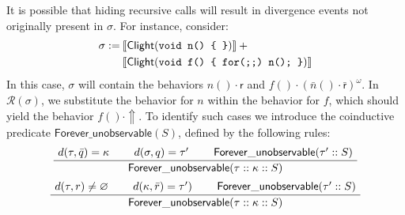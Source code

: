\documentclass[11pt]{article}
\newcommand{\kw}[1]{{\mathsf{#1}}}
\begin{document}
It is possible that hiding recursive calls
will result in divergence events not originally present in $\sigma$.
For instance, consider:
\begin{align*}
  \sigma := \: &\llbracket \kw{Clight}(\mbox{\tt void n() \{ \}}) \rrbracket \: + \\
 &\llbracket \kw{Clight}(\mbox{\tt void f() \{ for(;;) n(); \}}) \rrbracket
\end{align*}
In this case, $\sigma$ will contain the behaviors
$n() \cdot \kw{r}$ and $f() \cdot (\bar{n}() \cdot \bar{\kw{r}})^\omega$.
In $\mathcal{R}(\sigma)$,
we substitute the behavior for $n$ within the behavior for $f$,
which should yield the behavior $f() \cdot \Uparrow$.
To identify such cases we introduce the coinductive predicate
$\kw{Forever\_unobservable}(S)$,
defined by the following rules:
\[
  \AxiomC{$d(\tau, \bar{q}) = \kappa$}
  \AxiomC{$d(\sigma, q) = \tau'$}
  \AxiomC{$\kw{Forever\_unobservable}(\tau' :: S)$}
  \TrinaryInfC{$\kw{Forever\_unobservable}(\tau :: \kappa :: S)$}
  \DisplayProof
\]
\[
  \AxiomC{$d(\tau, r) \ne \varnothing$}
  \AxiomC{$d(\kappa, \bar{r}) = \tau')$}
  \AxiomC{$\kw{Forever\_unobservable}(\tau' :: S)$}
  \TrinaryInfC{$\kw{Forever\_unobservable}(\tau :: \kappa :: S)$}
  \DisplayProof
\]

\vfill


\end{document}
